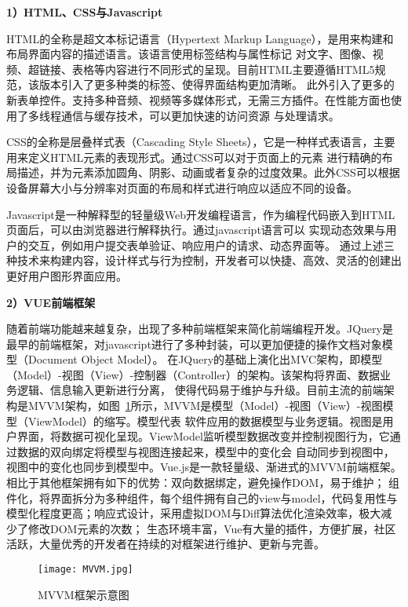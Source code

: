 \textbf{1）HTML、CSS与Javascript}

HTML的全称是超文本标记语言（Hypertext Markup Language），是用来构建和布局界面内容的描述语言。该语言使用标签结构与属性标记
对文字、图像、视频、超链接、表格等内容进行不同形式的呈现。目前HTML主要遵循HTML5规范，该版本引入了更多种类的标签、使得界面结构更加清晰。
此外引入了更多的新表单控件。支持多种音频、视频等多媒体形式，无需三方插件。在性能方面也使用了多线程通信与缓存技术，可以更加快速的访问资源
与处理请求。

CSS的全称是层叠样式表（Cascading Style Sheets），它是一种样式表语言，主要用来定义HTML元素的表现形式。通过CSS可以对于页面上的元素
进行精确的布局描述，并为元素添加圆角、阴影、动画或者复杂的过度效果。此外CSS可以根据设备屏幕大小与分辨率对页面的布局和样式进行响应以适应不同的设备。

Javascript是一种解释型的轻量级Web开发编程语言，作为编程代码嵌入到HTML页面后，可以由浏览器进行解释执行。通过javascript语言可以
实现动态效果与用户的交互，例如用户提交表单验证、响应用户的请求、动态界面等。
通过上述三种技术来构建内容，设计样式与行为控制，开发者可以快捷、高效、灵活的创建出更好用户图形界面应用。

\textbf{2）VUE前端框架}

随着前端功能越来越复杂，出现了多种前端框架来简化前端编程开发。JQuery是最早的前端框架，对javascript进行了多种封装，可以更加便捷的操作文档对象模型（Document Object Model）。
在JQuery的基础上演化出MVC架构，即模型（Model）-视图（View）-控制器（Controller）的架构。该架构将界面、数据业务逻辑、信息输入更新进行分离，
使得代码易于维护与升级。目前主流的前端架构是MVVM架构，如图~\ref{fig:mvvm}所示，MVVM是模型（Model）-视图（View）-视图模型（ViewModel）的缩写。模型代表
软件应用的数据模型与业务逻辑。视图是用户界面，将数据可视化呈现。ViewModel监听模型数据改变并控制视图行为，它通过数据的双向绑定将模型与视图连接起来，模型中的变化会
自动同步到视图中，视图中的变化也同步到模型中。Vue.js是一款轻量级、渐进式的MVVM前端框架。相比于其他框架拥有如下的优势：双向数据绑定，避免操作DOM，易于维护；
组件化，将界面拆分为多种组件，每个组件拥有自己的view与model，代码复用性与模型化程度更高；响应式设计，采用虚拟DOM与Diff算法优化渲染效率，极大减少了修改DOM元素的次数；
生态环境丰富，Vue有大量的插件，方便扩展，社区活跃，大量优秀的开发者在持续的对框架进行维护、更新与完善。

\begin{figure}
  \centering
  \texttt{[image: MVVM.jpg]}
  \caption{MVVM框架示意图}
  \label{fig:mvvm}
\end{figure}

